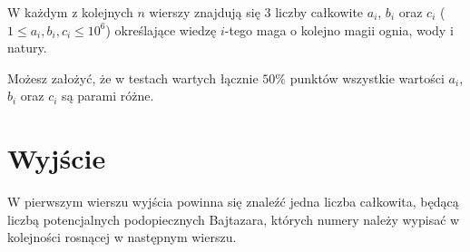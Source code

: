 \documentclass[zad,zawodnik,utf8]{sinol}
\begin{document}
\begin{tasktext}
W każdym z kolejnych $n$ wierszy znajdują się 3 liczby całkowite $a_i$, $b_i$ oraz $c_i$ ($1 \leq a_i, b_i, c_i \leq 10^6$) określające wiedzę $i$-tego maga o kolejno magii ognia, wody i natury.

Możesz założyć, że w testach wartych łącznie $50\%$ punktów wszystkie wartości $a_i$, $b_i$ oraz $c_i$ są parami różne.

  \section{Wyjście}
W pierwszym wierszu wyjścia powinna się znaleźć jedna liczba całkowita, będącą liczbą potencjalnych podopiecznych Bajtazara, których numery należy wypisać w kolejności rosnącej w następnym wierszu.

\makecompactexample

\end{tasktext}
\end{document}
